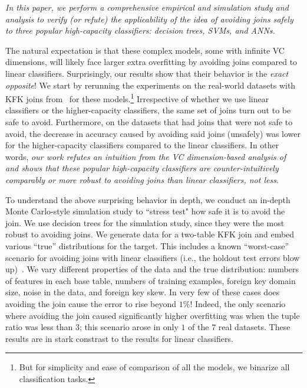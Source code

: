 \documentclass{vldb}
\begin{document}
\textit{In this paper, we perform a comprehensive empirical and simulation study and analysis to 
verify (or refute) the applicability of the idea of avoiding joins safely to three popular high-capacity 
classifiers: decision trees, SVMs, and ANNs.}

The natural expectation is that these complex models, some with infinite VC dimensions, will likely face 
larger extra overfitting by avoiding joins compared to linear classifiers. Surprisingly, our results 
show that their behavior is the \textit{exact opposite}! We start by rerunning the experiments on the 
real-world datasets with KFK joins from~\cite{hamlet} for these models.\footnote{But for simplicity 
and ease of comparison of all the models, we binarize all classification tasks.} Irrespective of whether 
we use linear classifiers or the higher-capacity classifiers, the same set of joins turn out to be safe to avoid.
Furthermore, on the datasets that had joins that were not safe to avoid, the decrease in accuracy caused 
by avoiding said joins (unsafely) was lower for the higher-capacity classifiers compared to the linear classifiers.
In other words, \textit{our work refutes an intuition from the VC dimension-based analysis of~\cite{hamlet} 
and shows that these popular high-capacity classifiers are counter-intuitively \textit{comparably} or 
\textit{more} robust to avoiding joins than linear classifiers, not less}.

To understand the above surprising behavior in depth, we conduct an in-depth Monte Carlo-style simulation study 
to ``stress test" how safe it is to avoid the join. We use decision trees for the simulation study, since they were 
the most robust to avoiding joins. We generate data for a two-table KFK join and embed various ``true'' distributions 
for the target. This includes a known ``worst-case'' scenario for avoiding joins with linear 
classifiers (i.e., the holdout test errors blow up)~\cite{hamlet}. We vary different properties of the data and the true distribution: 
numbers of features in each base table, numbers of training examples, foreign key domain size, noise in the data, and foreign key skew. 
In very few of these cases does avoiding the join cause the error to rise beyond $1\%$! Indeed, the only scenario where avoiding the join 
caused significantly higher overfitting was when the tuple ratio was less than $3$; this scenario arose in only $1$ of the $7$ real datasets.
These results are in stark constrast to the results for linear classifiers.
\end{document}
